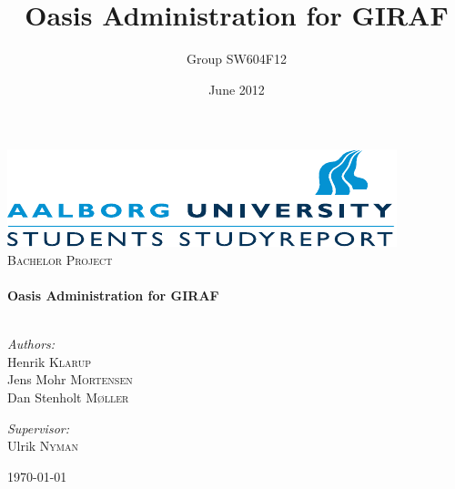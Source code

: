 



\author{Group SW604F12}
\title{Oasis Administration for GIRAF}
\date{June 2012}

\begin{titlepage}

\begin{center}

\includegraphics[width=\textwidth]{Images/aau_logo_en.pdf}\\[1cm]    


\textsc{\Large Bachelor Project}\\[0.5cm]


\HRule \\[0.4cm]
{ \huge \bfseries Oasis Administration for GIRAF}\\[0.4cm]

\HRule \\[1.5cm]

\begin{minipage}{0.4\textwidth}
\begin{flushleft} \large
\vspace{1.25cm}
\emph{Authors:}\\
Henrik \textsc{Klarup} \\
Jens Mohr \textsc{Mortensen} \\
Dan Stenholt \textsc{M\o{}ller}
\end{flushleft}
\end{minipage}
\begin{minipage}{0.4\textwidth}
\begin{flushright} \large
\emph{Supervisor:} \\
Ulrik \textsc{Nyman}
\end{flushright}
\end{minipage}

\vfill

{\large \today}

\end{center}

\end{titlepage}

